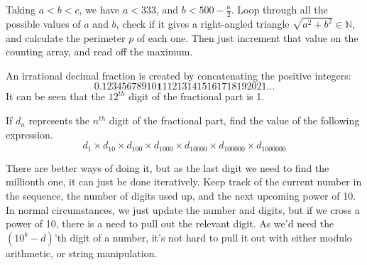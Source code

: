 Taking $a < b < c$, we have $a < 333$, and $b < 500 - \tfrac a2$.  Loop through all the possible values of $a$
and $b$, check if it gives a right-angled triangle $\sqrt{a^2+b^2} \in \mathbb{N}$, and calculate the perimeter
$p$ of each one.  Then just increment that value on the counting array, and read off the maximum.




An irrational decimal fraction is created by concatenating the positive integers:
$$0.12345678910\textbf{1}112131415161718192021...$$
It can be seen that the $12^{th}$ digit of the fractional part is 1.

If $d_n$ represents the $n^{th}$ digit of the fractional part, find the value of the following expression.
$$d_1 \times d_{10} \times d_{100} \times d_{1000} \times d_{10000} \times d_{100000} \times d_{1000000}$$

There are better ways of doing it, but as the last digit we need to find the millionth one, it can just be done
iteratively.  Keep track of the current number in the sequence, the number of digits used up, and the next upcoming
power of 10.  In normal circumstances, we just update the number and digits, but if we cross a power of 10, there
is a need to pull out the relevant digit.  As we'd need the $(10^k-d)$'th digit of a number, it's not hard to pull it out
with either modulo arithmetic, or string manipulation.




